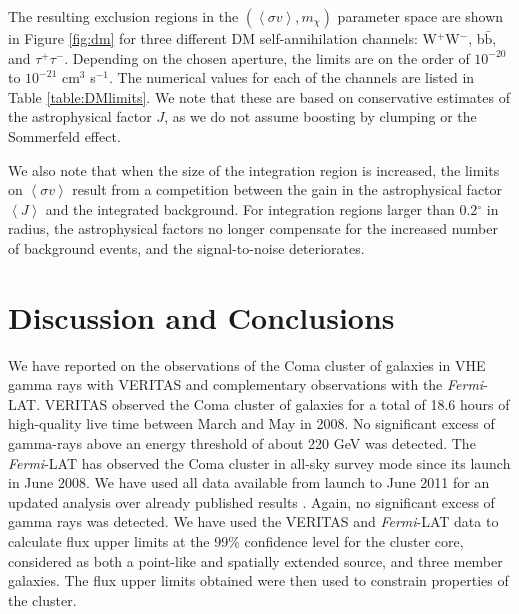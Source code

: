 \documentclass[12pt,manuscript]{aastex}
\newcommand{\expval}[1]{\left\langle #1 \right\rangle}
\begin{document}
The resulting exclusion regions in the $(\expval{\sigma v}, m_{\chi})$ parameter space are shown in
Figure \ref{fig:dm} for three different DM self-annihilation channels: W$^{+}$W$^{-}$,
b$\bar{\mathrm{b}}$, and $\tau^{+}\tau^{-}$. Depending on the chosen aperture, the limits are on
the order of $10^{-20}$ to $10^{-21}$ cm$^{3}$ s$^{-1}$. The numerical values for each of the channels
are listed in Table \ref{table:DMlimits}. We note that these are based on conservative estimates of
the astrophysical factor $J$, as we do not assume boosting by clumping or the Sommerfeld effect.

We also note that when the size of the integration region is increased, the limits on
$\expval{\sigma v}$ result from a competition between the gain in the astrophysical factor
$\expval{J}$ and the integrated background. For integration regions larger than 0.2$^{\circ}$ in
radius, the astrophysical factors no longer compensate for the increased number of background
events, and the signal-to-noise deteriorates.

%
%

\section{Discussion and Conclusions}
We have reported on the observations of the Coma cluster of galaxies in VHE gamma rays with VERITAS
and complementary observations with the \emph{Fermi}-LAT. VERITAS observed the Coma cluster of
galaxies for a total of 18.6 hours of high-quality live time between March and May in 2008. No
significant excess of gamma-rays above an energy threshold of about 220 GeV was detected. The
\emph{Fermi}-LAT has observed the Coma cluster in all-sky survey mode since its launch in June
2008. We have used all data available from launch to June 2011 for an updated analysis over already
published results \citep{article:Ackermann_etal:2010}. Again, no significant excess of gamma rays
was detected. We have used the VERITAS and \emph{Fermi}-LAT data to calculate flux upper limits at
the 99\% confidence level for the cluster core, considered as both a point-like and spatially
extended source, and three member galaxies. The flux upper limits obtained were then used to
constrain properties of the cluster.
\end{document}
